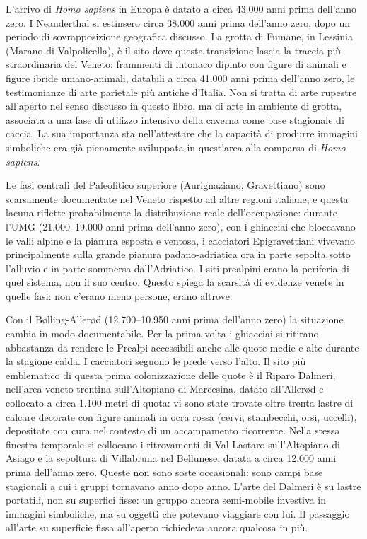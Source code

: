 L'arrivo di \textit{Homo sapiens} in Europa è datato a circa 43.000 anni prima dell'anno zero. I Neanderthal si estinsero circa 38.000 anni prima dell'anno zero, dopo un periodo di sovrapposizione geografica discusso. La grotta di Fumane, in Lessinia (Marano di Valpolicella), è il sito dove questa transizione lascia la traccia più straordinaria del Veneto: frammenti di intonaco dipinto con figure di animali e figure ibride umano-animali, databili a circa 41.000 anni prima dell'anno zero, le testimonianze di arte parietale più antiche d'Italia. Non si tratta di arte rupestre all'aperto nel senso discusso in questo libro, ma di arte in ambiente di grotta, associata a una fase di utilizzo intensivo della caverna come base stagionale di caccia. La sua importanza sta nell'attestare che la capacità di produrre immagini simboliche era già pienamente sviluppata in quest'area alla comparsa di \textit{Homo sapiens}.

Le fasi centrali del Paleolitico superiore (Aurignaziano, Gravettiano) sono scarsamente documentate nel Veneto rispetto ad altre regioni italiane, e questa lacuna riflette probabilmente la distribuzione reale dell'occupazione: durante l'UMG (21.000--19.000 anni prima dell'anno zero), con i ghiacciai che bloccavano le valli alpine e la pianura esposta e ventosa, i cacciatori Epigravettiani vivevano principalmente sulla grande pianura padano-adriatica ora in parte sepolta sotto l'alluvio e in parte sommersa dall'Adriatico. I siti prealpini erano la periferia di quel sistema, non il suo centro. Questo spiega la scarsità di evidenze venete in quelle fasi: non c'erano meno persone, erano altrove.

Con il Bølling-Allerød (12.700--10.950 anni prima dell'anno zero) la situazione cambia in modo documentabile. Per la prima volta i ghiacciai si ritirano abbastanza da rendere le Prealpi accessibili anche alle quote medie e alte durante la stagione calda. I cacciatori seguono le prede verso l'alto. Il sito più emblematico di questa prima colonizzazione delle quote è il Riparo Dalmeri, nell'area veneto-trentina sull'Altopiano di Marcesina, datato all'Allerød e collocato a circa 1.100 metri di quota: vi sono state trovate oltre trenta lastre di calcare decorate con figure animali in ocra rossa (cervi, stambecchi, orsi, uccelli), depositate con cura nel contesto di un accampamento ricorrente. Nella stessa finestra temporale si collocano i ritrovamenti di Val Lastaro sull'Altopiano di Asiago e la sepoltura di Villabruna nel Bellunese, datata a circa 12.000 anni prima dell'anno zero. Queste non sono soste occasionali: sono campi base stagionali a cui i gruppi tornavano anno dopo anno. L'arte del Dalmeri è su lastre portatili, non su superfici fisse: un gruppo ancora semi-mobile investiva in immagini simboliche, ma su oggetti che potevano viaggiare con lui. Il passaggio all'arte su superficie fissa all'aperto richiedeva ancora qualcosa in più.

